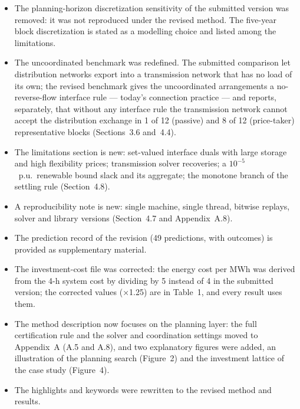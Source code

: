 \documentclass[11pt]{article}
\begin{document}
\begin{itemize}[leftmargin=*]
  \item The planning-horizon discretization sensitivity of the submitted version was removed: it was not reproduced under the revised method. The five-year block discretization is stated as a modelling choice and listed among the limitations.
  \item The uncoordinated benchmark was redefined. The submitted comparison let distribution networks export into a transmission network that has no load of its own; the revised benchmark gives the uncoordinated arrangements a no-reverse-flow interface rule --- today's connection practice --- and reports, separately, that without any interface rule the transmission network cannot accept the distribution exchange in 1 of 12 (passive) and 8 of 12 (price-taker) representative blocks (Sections~3.6 and~4.4).
  \item The limitations section is new: set-valued interface duals with large storage and high flexibility prices; transmission solver recoveries; a $10^{-5}$~p.u.\ renewable bound slack and its aggregate; the monotone branch of the settling rule (Section~4.8).
  \item A reproducibility note is new: single machine, single thread, bitwise replays, solver and library versions (Section~4.7 and Appendix~A.8).
  \item The prediction record of the revision (49 predictions, with outcomes) is provided as supplementary material.
  \item The investment-cost file was corrected: the energy cost per MWh was derived from the 4-h system cost by dividing by 5 instead of 4 in the submitted version; the corrected values (×1.25) are in Table~1, and every result uses them.
  \item The method description now focuses on the planning layer: the full certification rule and the solver and coordination settings moved to Appendix~A (A.5 and A.8), and two explanatory figures were added, an illustration of the planning search (Figure~2) and the investment lattice of the case study (Figure~4).
  \item The highlights and keywords were rewritten to the revised method and results.
\end{itemize}
\end{document}
